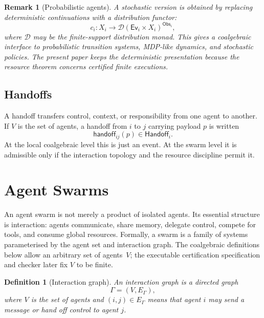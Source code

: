 \documentclass[a4paper,fleqn]{cas-sc}
\newtheorem{definition}{Definition}
\newtheorem{remark}{Remark}
\newcommand{\D}{\mathcal{D}}
\newcommand{\Obs}{\mathsf{Obs}}
\newcommand{\Ev}{\mathsf{Ev}}
\newcommand{\Handoff}{\mathsf{Handoff}}
\begin{document}
\begin{remark}[Probabilistic agents]
A stochastic version is obtained by replacing deterministic continuations with a distribution functor:
\[
  c_i:X_i\to \D(\Ev_i\times X_i)^{\Obs_i},
\]
where \(\D\) may be the finite-support distribution monad. This gives a coalgebraic interface to probabilistic transition systems, MDP-like dynamics, and stochastic policies. The present paper keeps the deterministic presentation because the resource theorem concerns certified finite executions.
\end{remark}

\subsection{Handoffs}

A handoff transfers control, context, or responsibility from one agent to another. If \(V\) is the set of agents, a handoff from \(i\) to \(j\) carrying payload \(p\) is written
\[
  \mathsf{handoff}_{ij}(p)\in\Handoff_i.
\]
At the local coalgebraic level this is just an event. At the swarm level it is admissible only if the interaction topology and the resource discipline permit it.

\section{Agent Swarms}

An agent swarm is not merely a product of isolated agents. Its essential structure is interaction: agents communicate, share memory, delegate control, compete for tools, and consume global resources. Formally, a swarm is a family of systems parameterised by the agent set and interaction graph. The coalgebraic definitions below allow an arbitrary set of agents~\(V\); the executable certification specification and checker later fix \(V\) to be finite.

\begin{definition}[Interaction graph]
An interaction graph is a directed graph
\[
  \Gamma=(V,E_{\Gamma}),
\]
where \(V\) is the set of agents and \((i,j)\in E_{\Gamma}\) means that agent \(i\) may send a message or hand off control to agent \(j\).
\end{definition}
\end{document}
